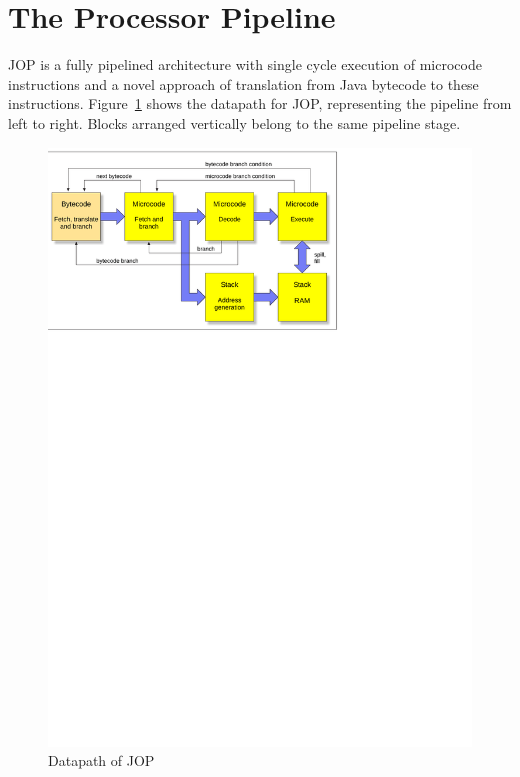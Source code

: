 \section{The Processor Pipeline}
\label{sec:pipeline}

JOP is a fully pipelined architecture with single cycle execution of
microcode instructions and a novel approach of translation from Java
bytecode to these instructions. Figure~\ref{fig_arch_pipeline} shows
the datapath for JOP, representing the pipeline from left to right.
Blocks arranged vertically belong to the same pipeline stage.

\begin{figure}
    \centering
    \includegraphics[scale=\picscale]{arch/arch_pipeline}
    \caption{Datapath of JOP}
    \label{fig_arch_pipeline}
\end{figure}

